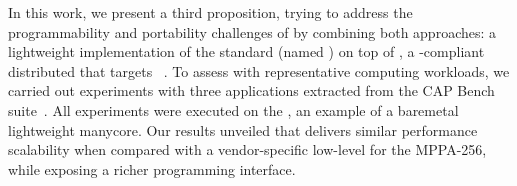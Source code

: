 	In this work, we present a third proposition, trying to address the programmability and
	portability challenges of \lws by combining both approaches: a lightweight
	implementation of the \mpi standard (named \lwmpi) on top of \nanvix,
	a \posix-compliant distributed \os that targets \lws~\cite{Penna2019-3}.
	To assess \lwmpi with representative
	computing workloads, we carried out experiments with three applications extracted
	from the CAP Bench suite~\cite{Souza2017}. All experiments were executed on the
	\mppa, an example of a baremetal lightweight manycore. Our results unveiled that
	\lwmpi delivers similar performance scalability when compared
	with a vendor-specific low-level \api for the MPPA-256, while exposing a richer
	programming interface.

